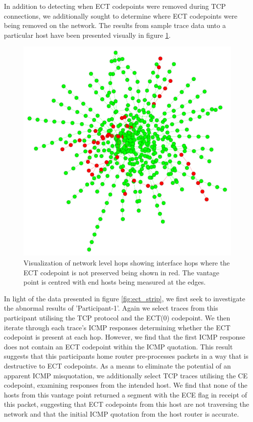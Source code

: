\documentclass{l4proj}
\begin{document}
In addition to detecting when ECT codepoints were removed during TCP connections, we additionally sought to determine where ECT codepoints were being removed on the network. The results from sample trace data unto a particular host have been presented visually in figure \ref{fig:traces}.

\begin{figure}[H]
    \centering
    \includegraphics[scale=0.1]{dissertation/images/hops.pdf}
    \caption{Visualization of network level hops showing interface hops where the ECT codepoint is not preserved being shown in red. The vantage point is centred with end hosts being measured at the edges.}
    \label{fig:traces}
\end{figure}

In light of the data presented in figure \ref{fig:ect_strip}, we first seek to investigate the abnormal results of 'Participant-1'. Again we select traces from this participant utilising the TCP protocol and the ECT(0) codepoint. We then iterate through each trace's ICMP responses determining whether the ECT codepoint is present at each hop. However, we find that the first ICMP response does not contain an ECT codepoint within the ICMP quotation. This result suggests that this participants home router pre-processes packets in a way that is destructive to ECT codepoints. As a means to eliminate the potential of an apparent ICMP misquotation, we additionally select TCP traces utilising the CE codepoint, examining responses from the intended host. We find that none of the hosts from this vantage point returned a segment with the ECE flag in receipt of this packet, suggesting that ECT codepoints from this host are not traversing the network and that the initial ICMP quotation from the host router is accurate.
\end{document}
